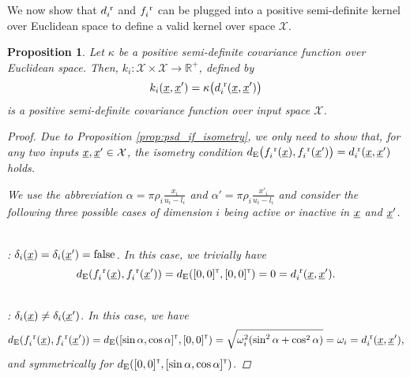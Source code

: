 \documentclass[letterpaper]{article}
\newcommand{\vect}[1]{\underline{\smash{#1}}}
\renewcommand{\v}[1]{\vect{#1}}
\newcommand{\reals}{\mathds{R}}
\newcommand{\sX}{\mathcal{X}}
\newcommand{\br}{^{\text{\textnormal{ r}}}}
\newcommand\transpose{{\textrm{\tiny{\sf{T}}}}}
\newtheorem{prop}[thm]{Proposition}
\begin{document}
We now show that $d\br_i$ and $f\br_i$ can be plugged into a positive semi-definite kernel over Euclidean space to define a valid kernel over space $\sX$.

\begin{prop}
Let $\kappa$ be a positive semi-definite covariance function over Euclidean space.
Then, $k_i\colon \sX \times \sX\to \reals^+$, defined by 
\[k_i(\v{x},\v{x}') = \kappa\bigl( d\br_i(\v{x}, \v{x}') \bigr)\]
is a positive semi-definite covariance function over input space $\sX$. 
\label{prop:cont_psd}
\begin{proof}
Due to Proposition \ref{prop:psd_if_isometry}, we only need to show that, for any two inputs $\v{x},\v{x}' \in \sX$, the isometry condition $d_{\text{E}}\bigl(f_i\br(\v{x}),f_i\br(\v{x}')\bigr) = d\br_i(\v{x},\v{x}')$ holds.

We use the abbreviation $\alpha = \pi\rho_i\frac{x_i}{u_i-l_i}$ and $\alpha' = \pi\rho_i\frac{x'_i}{u_i-l_i}$ and consider the following three possible cases of dimension $i$ being active or inactive in $\v{x}$ and $\v{x}'$.

~\\: $\delta_i(\v{x}) = \delta_i(\v{x}') = \textrm{false}$.
In this case, we trivially have 
\[d_{\text{E}}(f_i\br(\v{x}),f_i\br(\v{x}')) = d_{\text{E}}([0,0]^\transpose, [0,0]^\transpose) = 0 = d\br_i(\v{x},\v{x}').\]

~\\: $\delta_i(\v{x}) \neq \delta_i(\v{x}')$. In this case, we have
\[d_{\text{E}}(f_i\br(\v{x}),f_i\br(\v{x}')) = d_{\text{E}}([\sin{\alpha}, \cos{\alpha}]^\transpose, [0,0]^\transpose) = \sqrt{\omega_i^2 (\sin^2{\alpha} + \cos^2{\alpha})} = \omega_i = d\br_i(\v{x},\v{x}'),\]
and symmetrically for $d_{\text{E}}([0,0]^\transpose, [\sin{\alpha}, \cos{\alpha}]^\transpose)$.


\end{proof}
\end{prop}
\end{document}
